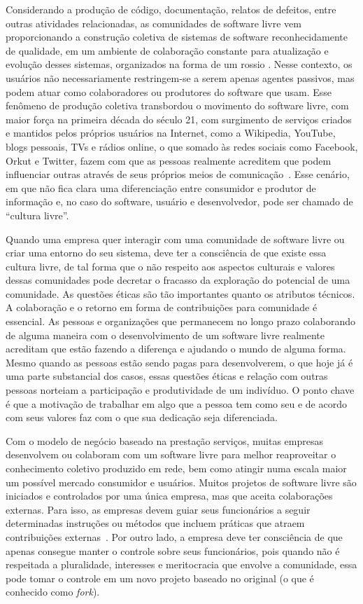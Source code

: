 Considerando a produção de código, documentação, relatos de defeitos, entre
outras atividades relacionadas, as comunidades de software livre vem proporcionando
a construção coletiva de sistemas de software reconhecidamente de qualidade, em
um ambiente de colaboração constante para atualização e evolução desses
sistemas, organizados na forma de um rossio \cite{simon:08}.
%
Nesse contexto, os usuários não necessariamente restringem-se a serem apenas
agentes passivos, mas podem atuar como colaboradores ou produtores do software
que usam.
%
Esse fenômeno de produção coletiva transbordou o movimento do software
livre, com maior força na primeira década do século 21, com surgimento de 
serviços criados e mantidos pelos próprios usuários na Internet, como a
Wikipedia, YouTube, blogs pessoais, TVs e rádios online, o que somado às redes
sociais como Facebook, Orkut e Twitter, fazem com que as pessoas realmente
acreditem que podem influenciar outras através de seus próprios meios de
comunicação~\cite{castells:06}.
%
Esse cenário, em que não fica clara uma diferenciação entre consumidor e produtor de
informação e, no caso do software, usuário e desenvolvedor, pode ser chamado de
``cultura livre''. 

Quando uma empresa quer interagir com uma comunidade de software livre ou
criar uma entorno do seu sistema, deve ter a consciência de que existe
essa cultura livre, de tal forma que o não respeito aos aspectos culturais e
valores dessas comunidades pode decretar o fracasso da
exploração do potencial de uma comunidade.
%
As questões éticas são tão importantes quanto os atributos técnicos. A colaboração
e o retorno em forma de contribuições para comunidade é essencial.
%
As pessoas e organizações que permanecem no longo prazo colaborando de alguma maneira com o
desenvolvimento de um software livre realmente acreditam que estão fazendo a 
diferença e ajudando o mundo de alguma forma.
%
Mesmo quando as pessoas estão sendo pagas para desenvolverem, o que hoje já é uma
parte substancial dos casos, essas questões éticas e relação com outras
pessoas norteiam a participação e produtividade de um indivíduo.
%
O ponto chave é que a motivação de trabalhar em algo que a pessoa tem como seu
e de acordo com seus valores faz com o que sua dedicação seja diferenciada.


Com o modelo de negócio baseado na prestação serviços, muitas empresas 
desenvolvem ou colaboram com um software livre para melhor reaproveitar
o conhecimento coletivo produzido em rede, bem como atingir numa escala
maior um possível mercado consumidor e usuários.
%
Muitos projetos de software livre são iniciados e controlados por uma única empresa,
mas que aceita colaborações externas.
%
Para isso, as empresas devem guiar seus funcionários a seguir
determinadas instruções ou métodos que incluem práticas que atraem
contribuições externas~\cite{corbucci:2011}.
%
Por outro lado, a empresa deve ter consciência de que apenas consegue manter o controle
sobre seus funcionários, pois quando não é respeitada a pluralidade, interesses
e meritocracia que envolve a comunidade, essa pode tomar o controle em
um novo projeto baseado no original (o que é conhecido como \textit{fork}).


